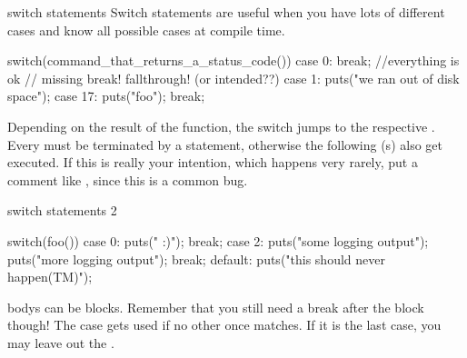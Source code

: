 \documentclass[10pt,graphics,aspectratio=169,table]{beamer}
\begin{document}
\begin{frame}[fragile]{switch statements}
    Switch statements are useful when you have lots of different 
    cases and know all possible cases at compile time. 
    \begin{codeblock}
switch(command_that_returns_a_status_code()){
    case 0: break; //everything is ok
    // missing break! fallthrough! (or intended??)
    case 1: puts("we ran out of disk space"); 
    case 17: puts("foo"); break;
}
    \end{codeblock}

    Depending on the result of the function, the switch jumps to the respective
    . Every  must be terminated by a 
     statement, otherwise the following (s) also get
    executed. If this is really your intention, which happens very rarely,
    put a comment like , since this is a common bug.
\end{frame}

\begin{frame}[fragile]{switch statements 2}
\begin{codeblock}
    switch(foo()){
        case 0: puts(" :)"); break;
        case 2: {
            puts("some logging output");
            puts("more logging output");
        }break;
        default: puts("this should never happen(TM)"); 
    }
\end{codeblock}

     bodys can be blocks. Remember that you still need a break 
    after the block though! The  case gets used if no other once
    matches. If it is the last case, you may leave out the .
\end{frame}
\end{document}
